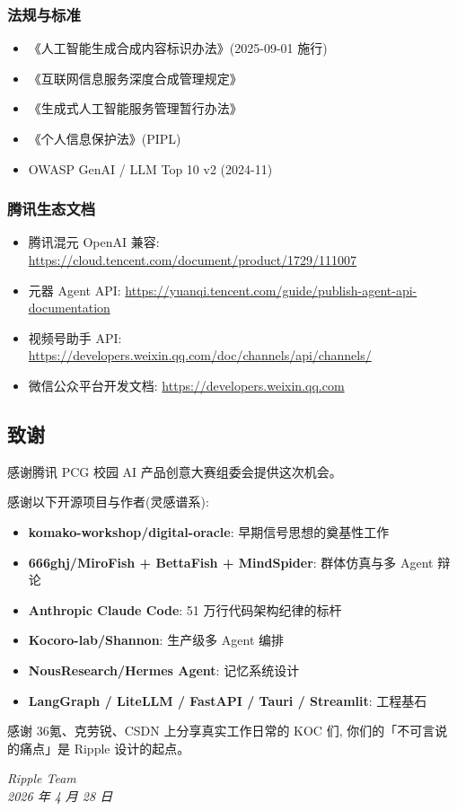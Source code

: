 \subsubsection{法规与标准}

\begin{itemize}
\item 《人工智能生成合成内容标识办法》(2025-09-01 施行)
\item 《互联网信息服务深度合成管理规定》
\item 《生成式人工智能服务管理暂行办法》
\item 《个人信息保护法》(PIPL)
\item OWASP GenAI / LLM Top 10 v2 (2024-11)
\end{itemize}

\subsubsection{腾讯生态文档}

\begin{itemize}
\item 腾讯混元 OpenAI 兼容: \url{https://cloud.tencent.com/document/product/1729/111007}
\item 元器 Agent API: \url{https://yuanqi.tencent.com/guide/publish-agent-api-documentation}
\item 视频号助手 API: \url{https://developers.weixin.qq.com/doc/channels/api/channels/}
\item 微信公众平台开发文档: \url{https://developers.weixin.qq.com}
\end{itemize}


\subsection{致谢}

感谢腾讯 PCG 校园 AI 产品创意大赛组委会提供这次机会。

感谢以下开源项目与作者(灵感谱系):

\begin{itemize}
\item \textbf{komako-workshop/digital-oracle}: 早期信号思想的奠基性工作
\item \textbf{666ghj/MiroFish + BettaFish + MindSpider}: 群体仿真与多 Agent 辩论
\item \textbf{Anthropic Claude Code}: 51 万行代码架构纪律的标杆
\item \textbf{Kocoro-lab/Shannon}: 生产级多 Agent 编排
\item \textbf{NousResearch/Hermes Agent}: 记忆系统设计
\item \textbf{LangGraph / LiteLLM / FastAPI / Tauri / Streamlit}: 工程基石
\end{itemize}

感谢 36氪、克劳锐、CSDN 上分享真实工作日常的 KOC 们,
你们的「不可言说的痛点」是 Ripple 设计的起点。

\bigskip

\begin{flushright}
\textit{Ripple Team \\
2026 年 4 月 28 日}
\end{flushright}
